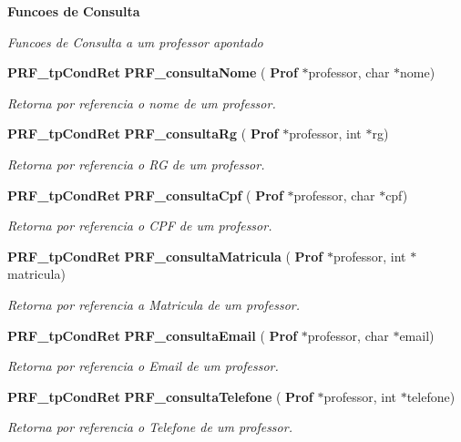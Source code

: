 \begin{Indent}\textbf{ Funcoes de Consulta}\par
{\em Funcoes de Consulta a um professor apontado }\begin{DoxyCompactItemize}
\item 
\textbf{ P\+R\+F\+\_\+tp\+Cond\+Ret} \textbf{ P\+R\+F\+\_\+consulta\+Nome} (\textbf{ Prof} $\ast$professor, char $\ast$nome)
\begin{DoxyCompactList}\small\item\em Retorna por referencia o nome de um professor. \end{DoxyCompactList}\item 
\textbf{ P\+R\+F\+\_\+tp\+Cond\+Ret} \textbf{ P\+R\+F\+\_\+consulta\+Rg} (\textbf{ Prof} $\ast$professor, int $\ast$rg)
\begin{DoxyCompactList}\small\item\em Retorna por referencia o RG de um professor. \end{DoxyCompactList}\item 
\textbf{ P\+R\+F\+\_\+tp\+Cond\+Ret} \textbf{ P\+R\+F\+\_\+consulta\+Cpf} (\textbf{ Prof} $\ast$professor, char $\ast$cpf)
\begin{DoxyCompactList}\small\item\em Retorna por referencia o C\+PF de um professor. \end{DoxyCompactList}\item 
\textbf{ P\+R\+F\+\_\+tp\+Cond\+Ret} \textbf{ P\+R\+F\+\_\+consulta\+Matricula} (\textbf{ Prof} $\ast$professor, int $\ast$matricula)
\begin{DoxyCompactList}\small\item\em Retorna por referencia a Matricula de um professor. \end{DoxyCompactList}\item 
\textbf{ P\+R\+F\+\_\+tp\+Cond\+Ret} \textbf{ P\+R\+F\+\_\+consulta\+Email} (\textbf{ Prof} $\ast$professor, char $\ast$email)
\begin{DoxyCompactList}\small\item\em Retorna por referencia o Email de um professor. \end{DoxyCompactList}\item 
\textbf{ P\+R\+F\+\_\+tp\+Cond\+Ret} \textbf{ P\+R\+F\+\_\+consulta\+Telefone} (\textbf{ Prof} $\ast$professor, int $\ast$telefone)
\begin{DoxyCompactList}\small\item\em Retorna por referencia o Telefone de um professor. \end{DoxyCompactList}\item 

\end{DoxyCompactItemize}
\end{Indent}
